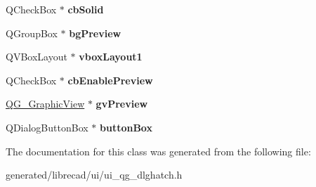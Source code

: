 \begin{DoxyCompactItemize}
\item 
\hypertarget{classUi__QG__DlgHatch_a12ee658eaa7cf3e3f9a29f3ff2186b39}{Q\-Check\-Box $\ast$ {\bfseries cb\-Solid}}\label{classUi__QG__DlgHatch_a12ee658eaa7cf3e3f9a29f3ff2186b39}

\item 
\hypertarget{classUi__QG__DlgHatch_aee1b6c03ae1b09b7259b6f9d96ffe1f0}{Q\-Group\-Box $\ast$ {\bfseries bg\-Preview}}\label{classUi__QG__DlgHatch_aee1b6c03ae1b09b7259b6f9d96ffe1f0}

\item 
\hypertarget{classUi__QG__DlgHatch_a55bef5d7cda09d4db8e95be9a0db88a5}{Q\-V\-Box\-Layout $\ast$ {\bfseries vbox\-Layout1}}\label{classUi__QG__DlgHatch_a55bef5d7cda09d4db8e95be9a0db88a5}

\item 
\hypertarget{classUi__QG__DlgHatch_a8acf17f4593a63c91edb44bc45d1c60f}{Q\-Check\-Box $\ast$ {\bfseries cb\-Enable\-Preview}}\label{classUi__QG__DlgHatch_a8acf17f4593a63c91edb44bc45d1c60f}

\item 
\hypertarget{classUi__QG__DlgHatch_ae3f59201ff1008b4ed24e4a0b3156d0a}{\hyperlink{classQG__GraphicView}{Q\-G\-\_\-\-Graphic\-View} $\ast$ {\bfseries gv\-Preview}}\label{classUi__QG__DlgHatch_ae3f59201ff1008b4ed24e4a0b3156d0a}

\item 
\hypertarget{classUi__QG__DlgHatch_a15d7bc9eee383ce3f9187155645cec82}{Q\-Dialog\-Button\-Box $\ast$ {\bfseries button\-Box}}\label{classUi__QG__DlgHatch_a15d7bc9eee383ce3f9187155645cec82}

\end{DoxyCompactItemize}


The documentation for this class was generated from the following file\-:\begin{DoxyCompactItemize}
\item 
generated/librecad/ui/ui\-\_\-qg\-\_\-dlghatch.\-h\end{DoxyCompactItemize}
